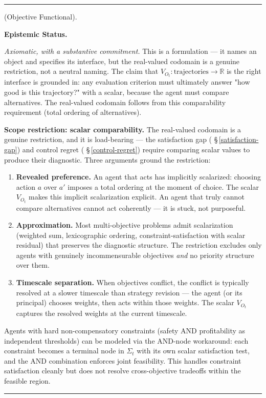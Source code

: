 \documentclass[11pt,oneside]{article}
\newcounter{claim}[section]
\renewcommand{\theclaim}{\thesection.\arabic{claim}}
\newenvironment{segment}[2]{%
  \refstepcounter{claim}%
  \bigskip\noindent\hrule\smallskip
  \noindent{\bfseries #1~\theclaim}\enskip(#2).\par\smallskip
  \noindent\ignorespaces
}{%
  \par\smallskip\noindent\hrule\bigskip
}
\newenvironment{formulation}[1][]{\begin{segment}{Formulation}{#1}}{\end{segment}}
\begin{document}
\begin{formulation}[Objective Functional]
\medskip\noindent\textbf{Epistemic Status.}


\textit{Axiomatic, with a substantive commitment.} This is a formulation — it names an object and specifies its interface, but the real-valued codomain is a genuine restriction, not a neutral naming. The claim that $V_{O_t}: \text{trajectories} \to \mathbb{R}$ is the right interface is grounded in: any evaluation criterion must ultimately answer "how good is this trajectory?" with a scalar, because the agent must compare alternatives. The real-valued codomain follows from this comparability requirement (total ordering of alternatives).

\textbf{Scope restriction: scalar comparability.} The real-valued codomain is a genuine restriction, and it is load-bearing — the satisfaction gap ( \S\,\ref{satisfaction-gap}) and control regret ( \S\,\ref{control-regret}) require comparing scalar values to produce their diagnostic. Three arguments ground the restriction:

\begin{enumerate}
  \item \textbf{Revealed preference.} An agent that acts has implicitly scalarized: choosing action $a$ over $a'$ imposes a total ordering at the moment of choice. The scalar $V_{O_t}$ makes this implicit scalarization explicit. An agent that truly cannot compare alternatives cannot act coherently — it is stuck, not purposeful.
  \item \textbf{Approximation.} Most multi-objective problems admit scalarization (weighted sum, lexicographic ordering, constraint-satisfaction with scalar residual) that preserves the diagnostic structure. The restriction excludes only agents with genuinely incommensurable objectives \textit{and} no priority structure over them.
  \item \textbf{Timescale separation.} When objectives conflict, the conflict is typically resolved at a slower timescale than strategy revision — the agent (or its principal) chooses weights, then acts within those weights. The scalar $V_{O_t}$ captures the resolved weights at the current timescale.
\end{enumerate}


Agents with hard non-compensatory constraints (safety AND profitability as independent thresholds) can be modeled via the AND-node workaround: each constraint becomes a terminal node in $\Sigma_t$ with its own scalar satisfaction test, and the AND combination enforces joint feasibility. This handles constraint satisfaction cleanly but does not resolve cross-objective tradeoffs within the feasible region.


\end{formulation}
\end{document}

